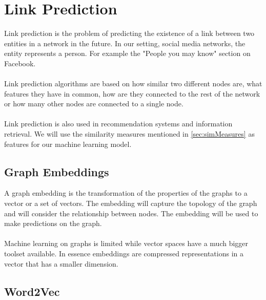 \section{Link Prediction}
\label{sec:linkpred}

Link prediction is the problem of predicting the existence of a link between two entities in a network in the future. In our setting, social media networks, the entity represents a person. For example the "People you may know" section on Facebook.
\\
\\
Link prediction algorithms are based on how similar two different nodes are, what features they have in common, how are they connected to the rest of the network or how many other nodes are connected to a single node. 
\\
\\
Link prediction is also used in recommendation systems and  information retrieval. We will use the similarity measures mentioned in \ref{sec:simMeasures} as features for our machine learning model.

\subsection{Graph Embeddings}
\label{sec:embeddings}

A graph embedding is the transformation of the properties of the graphs to a vector or a set of vectors. The embedding will capture the topology of the graph and will consider the relationship between nodes. The embedding will be used to make predictions on the graph.
\\
\\
\noindent Machine learning on graphs is limited while vector spaces have a much bigger toolset available. In essence embeddings are compressed representations in a vector that has a smaller dimension.

\subsection{Word2Vec}

